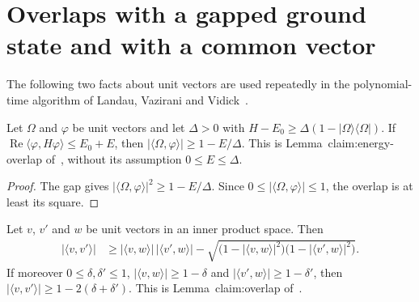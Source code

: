\section{Overlaps with a gapped ground state and with a common vector}

The following two facts about unit vectors are used repeatedly in the
polynomial-time algorithm of Landau, Vazirani and
Vidick~\cite[lines 297--317]{Landau2013PolynomialTime}.

\begin{theorem}
    \label{thm:overlap_from_energy}
    \leanok
    Let $\Omega$ and $\varphi$ be unit vectors and let $\Delta>0$ with
    $H-E_0\ge\Delta(1-\lvert\Omega\rangle\langle\Omega\rvert)$. If
    $\operatorname{Re}\langle\varphi,H\varphi\rangle\le E_0+E$, then
    $\lvert\langle\Omega,\varphi\rangle\rvert\ge1-E/\Delta$.
    This is Lemma~claim:energy-overlap
    of~\cite[lines 297--305]{Landau2013PolynomialTime}, without its assumption
    $0\le E\le\Delta$.
\end{theorem}

\begin{proof}
    \leanok
    The gap gives
    $\lvert\langle\Omega,\varphi\rangle\rvert^2\ge1-E/\Delta$. Since
    $0\le\lvert\langle\Omega,\varphi\rangle\rvert\le1$, the overlap is at least
    its square.
\end{proof}

\begin{theorem}
    \label{thm:overlap_through_common_vector}
    \leanok
    Let $v$, $v'$ and $w$ be unit vectors in an inner product space. Then
    \begin{align}
        \lvert\langle v,v'\rangle\rvert
         & \ge\lvert\langle v,w\rangle\rvert\,\lvert\langle v',w\rangle\rvert
        -\sqrt{\bigl(1-\lvert\langle v,w\rangle\rvert^2\bigr)
            \bigl(1-\lvert\langle v',w\rangle\rvert^2\bigr)}.
        \label{eq:overlap_through_common_vector}
    \end{align}
    If moreover $0\le\delta,\delta'\le1$,
    $\lvert\langle v,w\rangle\rvert\ge1-\delta$ and
    $\lvert\langle v',w\rangle\rvert\ge1-\delta'$, then
    $\lvert\langle v,v'\rangle\rvert\ge1-2(\delta+\delta')$. This is
    Lemma~claim:overlap of~\cite[lines 307--317]{Landau2013PolynomialTime}.
\end{theorem}

